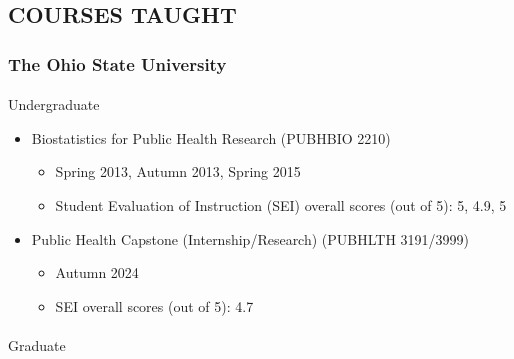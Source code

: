 \documentclass[
  english,
  letterpaper,
  DIV=11,
  numbers=noendperiod]{scrartcl}
\makeatletter
\let\oldparagraph\paragraph
\renewcommand{\paragraph}{
    \@ifstar
      \xxxParagraphStar
      \xxxParagraphNoStar
  }
\newcommand{\xxxParagraphStar}[1]{\oldparagraph*{#1}\mbox{}}
\newcommand{\xxxParagraphNoStar}[1]{\oldparagraph{#1}\mbox{}}
\providecommand{\tightlist}{%
  \setlength{\itemsep}{0pt}\setlength{\parskip}{0pt}}
\makeatother
\begin{document}
\subsection{COURSES TAUGHT}\label{courses-taught}

\subsubsection{The Ohio State
University}\label{the-ohio-state-university}

\paragraph{Undergraduate}\label{undergraduate}

\begin{itemize}
\tightlist
\item
  Biostatistics for Public Health Research (PUBHBIO 2210)

  \begin{itemize}
  \tightlist
  \item
    Spring 2013, Autumn 2013, Spring 2015
  \item
    Student Evaluation of Instruction (SEI) overall scores (out of 5):
    5, 4.9, 5
  \end{itemize}
\item
  Public Health Capstone (Internship/Research) (PUBHLTH 3191/3999)

  \begin{itemize}
  \tightlist
  \item
    Autumn 2024
  \item
    SEI overall scores (out of 5): 4.7
  \end{itemize}
\end{itemize}

\paragraph{Graduate}\label{graduate}
\end{document}
